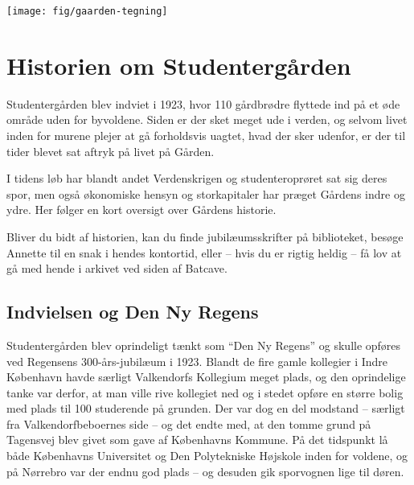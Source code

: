 \documentclass[11pt,article,twoside,openany,danish,extrafontsizes]{memoir} %
\begin{document}
\begin{center}

\vfill
\texttt{[image: fig/gaarden-tegning]}

\end{center}



\clearpage


\chapter{Historien om Studentergården}
\label{chap:historie}
Studentergården blev indviet i 1923, hvor 110 gårdbrødre flyttede ind på et øde område uden for byvoldene. Siden er der sket meget ude i verden, og selvom livet inden for murene plejer at gå forholdsvis uagtet, hvad der sker udenfor, er der til tider blevet sat aftryk på livet på Gården.

I tidens løb har blandt andet Verdenskrigen og studenteroprøret sat sig deres spor, men også økonomiske hensyn og storkapitaler har præget Gårdens indre og ydre. Her følger en kort oversigt over Gårdens historie.

Bliver du bidt af historien, kan du finde jubilæumsskrifter på biblioteket, besøge Annette til en snak i hendes kontortid, eller -- hvis du er rigtig heldig -- få lov at gå med hende i arkivet ved siden af Batcave.

\section{Indvielsen og Den Ny Regens}
Studentergården blev oprindeligt tænkt som \enquote{Den Ny Regens} og skulle opføres ved Regensens 300-års-jubilæum i 1923. Blandt de fire gamle kollegier i Indre København havde særligt Valkendorfs Kollegium meget plads, og den oprindelige tanke var derfor, at man ville rive kollegiet ned og i stedet opføre en større bolig med plads til 100 studerende på grunden. Der var dog en del modstand -- særligt fra Valkendorfbeboernes side -- og det endte med, at den tomme grund på Tagensvej blev givet som gave af Københavns Kommune. På det tidspunkt lå både Københavns Universitet og Den Polytekniske Højskole inden for voldene, og på Nørrebro var der endnu god plads -- og desuden gik sporvognen lige til døren.
\end{document}
